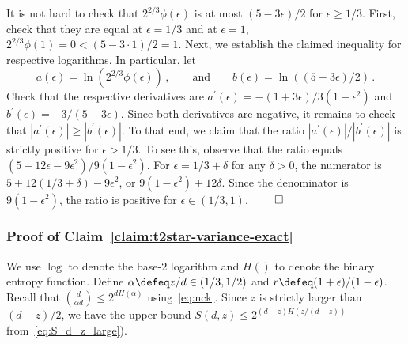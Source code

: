   It is not hard to check that 
  $2^{2/3} \phi(\epsilon)$ is at most $(5 - 3\epsilon)/2$ for $\epsilon \geq 1/3$. 
  First, check that they are equal at $\epsilon = 1/3$ and 
  at $\epsilon = 1$, $2^{2/3}\phi(1) = 0 < (5 - 3\cdot 1)/2 = 1$.
  Next, we establish the claimed
  inequality for respective logarithms. 
  In particular, let 
  \[
      a(\epsilon) = \ln\left( 2^{2/3} \phi(\epsilon) \right)
      \,,\qquad\text{and}\qquad 
      b(\epsilon) = \ln\left( (5 - 3 \epsilon)/2\right)
      \,.
  \]
  Check that the respective derivatives are 
  $a^\prime(\epsilon) = -(1+3 \epsilon)/3(1 - \epsilon^2)$ 
  and $b^\prime(\epsilon) = - 3/(5 - 3\epsilon)$. 
  Since both derivatives are negative, it remains to check that $|a^\prime(\epsilon)| \geq |b^\prime(\epsilon)|$. 
  To that end, we claim that the ratio $|a^\prime(\epsilon)|/|b^\prime(\epsilon)|$ 
  is strictly positive for $\epsilon > 1/3$. 
  To see this, observe that the ratio equals $(5 + 12 \epsilon - 9 \epsilon^2)/9(1-\epsilon^2)$. 
  For $\epsilon = 1/3 + \delta$ for any $\delta > 0$, 
  the numerator is $5 + 12 (1/3 + \delta) - 9 \epsilon^2$, 
  or $9(1 - \epsilon^2) + 12\delta$. 
  Since the denominator is $9(1 - \epsilon^2)$, the ratio is positive for $\epsilon \in(1/3, 1)$. 
\hfill$\qed$





\subsubsection{Proof of Claim~\ref{claim:t2star-variance-exact}}
  We use $\log$ to denote the base-$2$ logarithm and $H()$ to denote the binary entropy function. 
  Define $\alpha \defeq z/d \in (1/3, 1/2)$ and $r \defeq (1+\epsilon)/(1-\epsilon)$.
  Recall that $\binom{d}{\alpha d} \leq 2^{d H(\alpha)}$ using~\eqref{eq:nck}.
  Since $z$ is strictly larger than $(d - z)/2$, 
  we have the upper bound $S(d,z) \leq 2^{(d-z)H(z/(d-z))}$ from~\eqref{eq:S_d_z_large}). %


